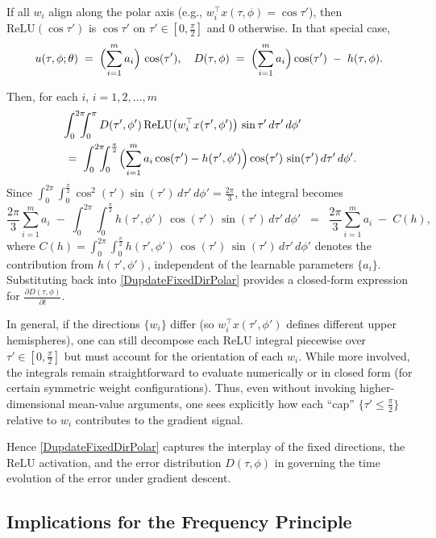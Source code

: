 \documentclass[review,onefignum,onetabnum,onealgnum]{siamart250106}
\numberwithin{theorem}{section}
\begin{document}
If all \(w_i\) align along the polar axis (e.g., \(w_i^\top x(\tau,\phi) = \cos\tau'\)), then 
\(\mathrm{ReLU}(\cos\tau')\) is $\cos\tau'$ on \(\tau'\in[0,\tfrac{\pi}{2}]\) and $0$ otherwise.  
In that special case,
\[
u(\tau,\phi;\theta)
\;=\;
\Bigl(\sum_{i=1}^m a_i\Bigr)\,\cos(\tau'),
\quad
D(\tau,\phi)
\;=\;
\Bigl(\sum_{i=1}^m a_i\Bigr)\cos(\tau')\;-\;h(\tau,\phi).
\]

Then, for each $i$, $i = 1,2, \ldots, m$
\[
\begin{aligned}
    &\int_{0}^{2\pi}\!\!\!\!\int_{0}^{\pi}
D(\tau',\phi')\,\mathrm{ReLU}\bigl(w_i^\top x(\tau',\phi')\bigr)
\,\sin\tau'\,d\tau'\,d\phi' \\
&\;=\;
\int_{0}^{2\pi}\!\!\!\!\int_{0}^{\frac{\pi}{2}}
\Bigl(\sum_{i=1}^m a_i \cos(\tau') - h(\tau',\phi')\Bigr)
\cos(\tau')\,\sin(\tau')\,d\tau'\,d\phi'.
\end{aligned}
\]
Since 
\(\int_{0}^{2\pi}\int_{0}^{\tfrac{\pi}{2}}\cos^2(\tau')\sin(\tau')\,d\tau'\,d\phi'= \tfrac{2\pi}{3}\),
the integral becomes
\[
\frac{2\pi}{3}\sum_{i=1}^m a_i
\;-\;
\int_{0}^{2\pi}\!\!\int_{0}^{\tfrac{\pi}{2}}
h(\tau',\phi')\,\cos(\tau')\,\sin(\tau')\,d\tau'\,d\phi'
\;\;=\;\;
\frac{2\pi}{3}\sum_{i = 1}^m a_i \;-\;C(h),
\]
where
\(
C(h) = \int_{0}^{2\pi}\!\!\int_{0}^{\tfrac{\pi}{2}}
h(\tau',\phi')\,\cos(\tau')\,\sin(\tau')\,d\tau'\,d\phi'
\)
denotes the contribution from \(h(\tau',\phi')\), independent of the learnable parameters
\(\{a_i\}\).  Substituting back into \eqref{DupdateFixedDirPolar} provides a closed-form expression 
for \(\tfrac{\partial D(\tau,\phi)}{\partial t}\).


In general, if the directions $\{w_i\}$ differ (so $w_i^\top x(\tau',\phi')$ defines different upper hemispheres), one can still decompose each ReLU integral piecewise over \(\tau'\in[0,\tfrac{\pi}{2}]\) but must account for the orientation of each $w_i$.  While more involved, the integrals remain straightforward to evaluate numerically or in closed form (for certain symmetric weight configurations). Thus, even without invoking higher-dimensional mean-value arguments, one sees explicitly how each  ``cap'' $\{\tau'\le \tfrac{\pi}{2}\}$ relative to $w_i$ contributes to the gradient signal.  

Hence \eqref{DupdateFixedDirPolar} captures the interplay of the fixed directions, the ReLU activation, and the error distribution $D(\tau,\phi)$ in governing the time evolution of the error under gradient descent.



\subsection{Implications for the Frequency Principle}
\label{Sec:ImplicationsFP}
\end{document}
